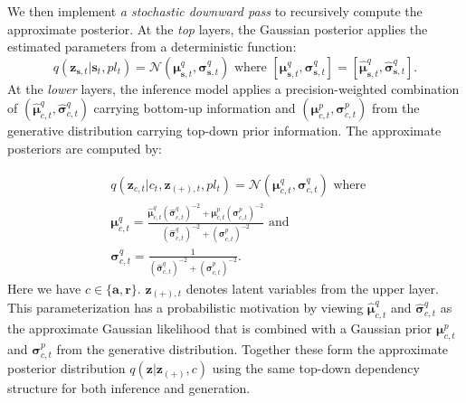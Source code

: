 \documentclass[letterpaper]{article} %
\newcommand{\context}{c}
\newcommand{\latentvariables}{\mathbf{z}}
\newcommand{\state}{\mathbf{s}}
\newcommand{\action}{\mathbf{a}}
\newcommand{\reward}{\boldsymbol{r}}
\newcommand{\player}{pl}
\begin{document}
We then implement {\it a stochastic downward pass} to recursively compute the
approximate posterior. At the {\it top} layers, the Gaussian posterior applies the estimated parameters from a deterministic function:
\begin{equation}
    q(\latentvariables_{\state,t}|\state_{t},\player_{t})=\mathcal{N}(\boldsymbol{\mu}^{q}_{\state,t},\boldsymbol{\sigma}^{q}_{\state,t}) \text{ where } [\boldsymbol{\mu}^{q}_{\state,t},\boldsymbol{\sigma}^{q}_{\state,t}]=[\boldsymbol{\hat{\mu}}^{q}_{\state,t},\boldsymbol{\hat{\sigma}}^{q}_{\state,t}].
\end{equation}
At the {\it lower} layers, the inference model applies a precision-weighted combination of
$(\boldsymbol{\hat{\mu}}^{q}_{\context,t}, \boldsymbol{\hat{\sigma}}^{q}_{\context,t})$
carrying bottom-up information and $(\boldsymbol{\mu}^{p}_{\context,t}, \boldsymbol{\sigma}^{p}_{\context,t})$
from the generative distribution carrying
top-down prior information. The approximate posteriors are computed by:

\vspace{-0.1in}
\begin{align}
    &q(\latentvariables_{\context,t}|\context_{t},\latentvariables_{(+),t}, \player_{t})=\mathcal{N}(\boldsymbol{\mu}^{q}_{\context,t},\boldsymbol{\sigma}^{q}_{\context,t}) \text{ where } \\
    &\boldsymbol{\mu}^{q}_{\context,t} = \frac{\boldsymbol{\hat{\mu}}^{q}_{\context,t}(\boldsymbol{\hat{\sigma}}^{q}_{\context,t})^{-2}+\boldsymbol{\mu}^{p}_{\context,t}(\boldsymbol{\sigma}^{p}_{\context,t})^{-2}}{(\boldsymbol{\hat{\sigma}}^{q}_{\context,t})^{-2}+(\boldsymbol{\sigma}^{p}_{\context,t})^{-2}} \text{ and } \nonumber\\
    &\boldsymbol{\sigma}^{q}_{\context,t}=\frac{1}{(\boldsymbol{\hat{\sigma}}^{q}_{\context,t})^{-2}+(\boldsymbol{\sigma}^{p}_{\context,t})^{-2}}.\nonumber
\end{align}
Here we have $\context\in\{\action,\reward\}$. $\latentvariables_{(+),t}$ denotes latent variables from the upper layer. This parameterization has a probabilistic motivation by viewing $\boldsymbol{\hat{\mu}}^{q}_{\context,t}$ and $\boldsymbol{\hat{\sigma}}^{q}_{\context,t}$
as the approximate Gaussian likelihood that is combined with a Gaussian prior $\boldsymbol{\mu}^{p}_{\context,t}$ and $\boldsymbol{\sigma}^{p}_{\context,t}$
from the generative distribution. Together these form the approximate posterior distribution $q(\latentvariables|\latentvariables_{(+)}, \context)$ using the same top-down dependency structure for both inference and generation.
\end{document}
